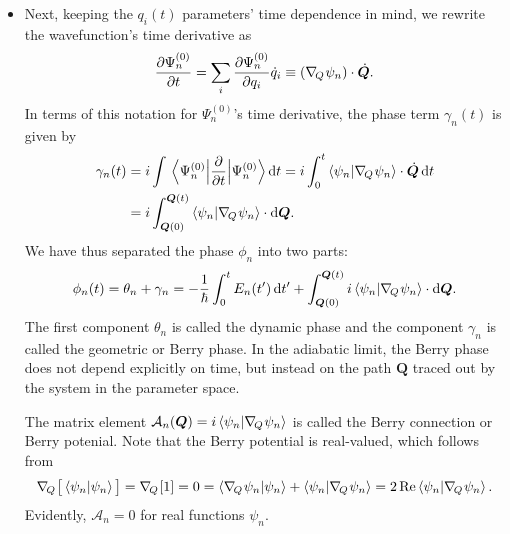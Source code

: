 \documentclass[11pt, a4paper]{article}
\newcommand{\diff}{\mathop{}\!\mathrm{d}} %
\renewcommand{\grad}{\nabla}
\renewcommand{\vec}[1]{\bm{#1}}  %
\newcommand{\Q}{\vec{Q}}  %
\newcommand{\gq}{\grad_{\mspace{-3mu}Q}\mspace{1mu}}
\renewcommand{\P}{\Psi}  %
\begin{document}
\begin{itemize}
    \item Next, keeping the $ q_{i}(t) $ parameters' time dependence in mind, we rewrite the wavefunction's time derivative as
    \begin{equation*}
        \pdv{\P_{n}^{(0)}}{t} = \sum_{i} \pdv{\Psi_{n}^{(0)}}{q_{i}}\dot{q}_{i} \equiv (\gq\psi_{n}) \cdot \dot{\Q}.
    \end{equation*}
    In terms of this notation for $ \Psi_{n}^{(0)} $'s time derivative, the phase term $ \gamma_{n}(t) $ is given by
    \begin{align*}
        \gamma_{n}(t) &= i \int \mel{\Psi_{n}^{(0)}}{\pdv{t}}{\Psi_{n}^{(0)}} \diff t = i\int_{0}^{t} \braket{\psi_{n}}{\gq \psi_{n}} \cdot \dot{\Q} \diff t\\
        & = i\int_{\Q(0)}^{\Q(t)} \braket{\psi_{n}}{\gq\psi_{n}} \cdot \diff \Q.
    \end{align*}
    We have thus separated the phase $ \phi_{n} $ into two parts:
    \begin{equation*}
        \phi_{n}(t) = \theta_{n} + \gamma_{n} = - \frac{1}{\hbar}\int_{0}^{t}E_{n}(t')\diff t' + \int_{\Q(0)}^{\Q(t)} i \braket{\psi_{n}}{\gq \psi_{n}} \cdot \diff \Q.
    \end{equation*}
    The first component $ \theta_{n} $ is called the dynamic phase and the component $ \gamma_{n} $ is called the geometric or Berry phase. In the adiabatic limit, the Berry phase does not depend explicitly on time, but instead on the path $ \Q $ traced out by the system in the parameter space.

    The matrix element $ \mathcal{A}_{n}(\Q) = i \braket{\psi_{n}}{\gq \psi_{n}}$  is called the Berry connection or Berry potenial. Note that the Berry potential is real-valued, which follows from
    \begin{equation*}
        \gq \big[ \braket{\psi_{n}}{\psi_{n}} \big] = \gq [1] = 0 = \braket{\gq \psi_{n}}{\psi_{n}} + \braket{\psi_{n}}{\gq \psi_{n}} = 2 \Re \braket{\psi_{n}}{\gq \psi_{n}}.
    \end{equation*}
    Evidently, $ \mathcal{A}_{n} = 0 $ for real functions $ \psi_{n} $. 


\end{itemize}
\end{document}
